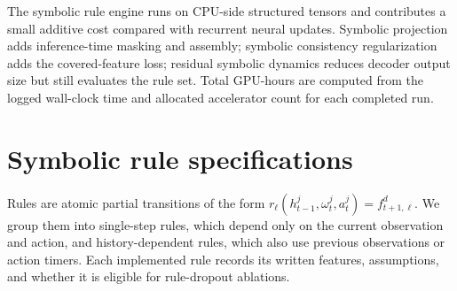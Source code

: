 \documentclass{article}
\theoremstyle{plain}
\theoremstyle{definition}
\theoremstyle{remark}
\begin{document}
The symbolic rule engine runs on CPU-side structured tensors and contributes a small additive cost compared with recurrent neural updates. Symbolic projection adds inference-time masking and assembly; symbolic consistency regularization adds the covered-feature loss; residual symbolic dynamics reduces decoder output size but still evaluates the rule set. Total GPU-hours are computed from the logged wall-clock time and allocated accelerator count for each completed run.


\section{Symbolic rule specifications}
\label{app:symbolic-rules}

Rules are atomic partial transitions of the form
$r_\ell(h^j_{t-1},\omega^j_t,a^j_t)=f^d_{t+1,\ell}$.
We group them into single-step rules, which depend only on the current observation and action, and history-dependent rules, which also use previous observations or action timers. Each implemented rule records its written features, assumptions, and whether it is eligible for rule-dropout ablations.
\end{document}
